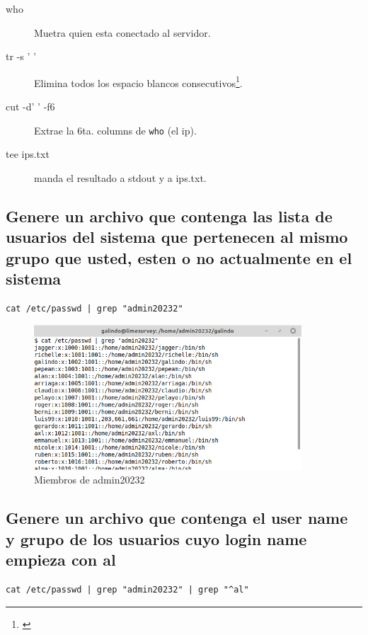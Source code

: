 \documentclass[11pt]{article}
\begin{document}
\begin{description}
\item[{who          }] Muetra quien esta conectado al servidor.
\item[{tr -s ' '    }] Elimina todos los espacio blancos consecutivos\footnote{\cite{StackExchange}}.
\item[{cut -d' ' -f6}] Extrae la 6ta. columns de \texttt{who} (el ip).
\item[{tee ips.txt  }] manda el resultado a stdout y a ips.txt.
\end{description}

\pagebreak

\subsection{Genere un archivo que contenga las lista de usuarios del sistema que pertenecen al mismo grupo que usted,  esten o no actualmente en el sistema}
\label{sec:org5950083}
\begin{verbatim}
cat /etc/passwd | grep "admin20232"
\end{verbatim}

\begin{figure}[htbp]
\centering
\includegraphics[width=10cm]{img/14.png}
\caption{Miembros de admin20232}
\end{figure}


\cite{A2022}

\subsection{Genere un archivo que contenga el user name y grupo de los usuarios cuyo login name empieza con al}
\label{sec:org05ea107}
\begin{verbatim}
cat /etc/passwd | grep "admin20232" | grep "^al"
\end{verbatim}
\end{document}
